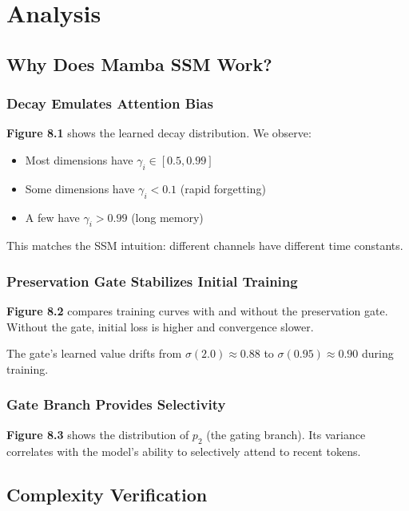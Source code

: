\section{Analysis}

\subsection{Why Does Mamba SSM Work?}

\subsubsection{Decay Emulates Attention Bias}

\textbf{Figure 8.1} shows the learned decay distribution. We observe:

\begin{itemize}
\item Most dimensions have $\gamma_i \in [0.5, 0.99]$
\item Some dimensions have $\gamma_i < 0.1$ (rapid forgetting)
\item A few have $\gamma_i > 0.99$ (long memory)

\end{itemize}
This matches the SSM intuition: different channels have different time 
constants.

\subsubsection{Preservation Gate Stabilizes Initial Training}

\textbf{Figure 8.2} compares training curves with and without the preservation 
gate. Without the gate, initial loss is higher and convergence slower.

The gate's learned value drifts from $\sigma(2.0) \approx 0.88$ to 
$\sigma(0.95) \approx 0.90$ during training.

\subsubsection{Gate Branch Provides Selectivity}

\textbf{Figure 8.3} shows the distribution of $p_2$ (the gating branch). Its 
variance correlates with the model's ability to selectively attend to 
recent tokens.

\subsection{Complexity Verification}

